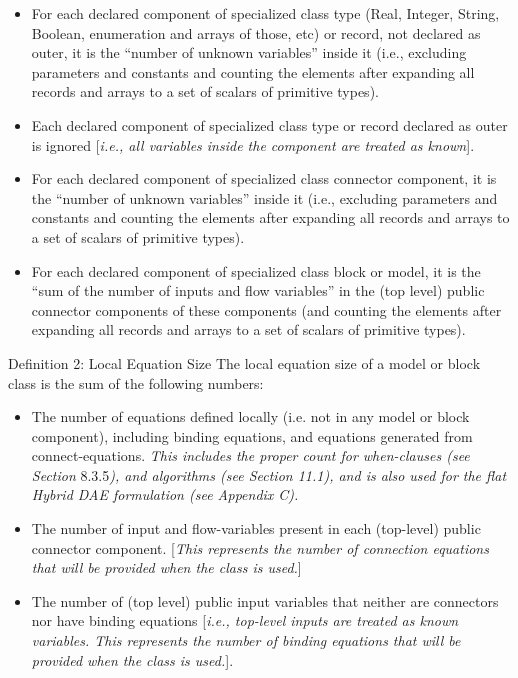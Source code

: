 \documentclass[10pt,a4paper]{report}
\def\Mcomment#1{{[}\emph{#1}{]}}
\begin{document}
\begin{itemize}
\item
  For each declared component of specialized class type (Real, Integer,
  String, Boolean, enumeration and arrays of those, etc) or record, not
  declared as outer, it is the ``number of unknown variables'' inside it
  (i.e., excluding parameters and constants and counting the elements
  after expanding all records and arrays to a set of scalars of
  primitive types).
\item
  Each declared component of specialized class type or record declared
  as outer is ignored \Mcomment{i.e., all variables inside the component
  are treated as known}.
\item
  For each declared component of specialized class connector component,
  it is the ``number of unknown variables'' inside it (i.e., excluding
  parameters and constants and counting the elements after expanding all
  records and arrays to a set of scalars of primitive types).
\item
  For each declared component of specialized class block or model, it is
  the ``sum of the number of inputs and flow variables'' in the (top
  level) public connector components of these components (and counting
  the elements after expanding all records and arrays to a set of
  scalars of primitive types).
\end{itemize}

{Definition 2: Local Equation Size}
The local equation size of a model or block class is the sum of the
following numbers:


\begin{itemize}
\item
  The number of equations defined locally (i.e. not in any model or
  block component), including binding equations, and equations generated
  from connect-equations. \emph{This includes the proper count for
  when-clauses (see Section} 8.3.5\emph{), and algorithms (see Section
  11.1), and is also used for the flat Hybrid DAE formulation (see Appendix C).}
\item
  The number of input and flow-variables present in each (top-level)
  public connector component. \Mcomment{This represents the number of
  connection equations that will be provided when the class is used.}
\item
  The number of (top level) public input variables that neither are
  connectors nor have binding equations \Mcomment{i.e., top-level inputs
  are treated as known variables. This represents the number of binding
  equations that will be provided when the class is used.}.
\end{itemize}
\end{document}
